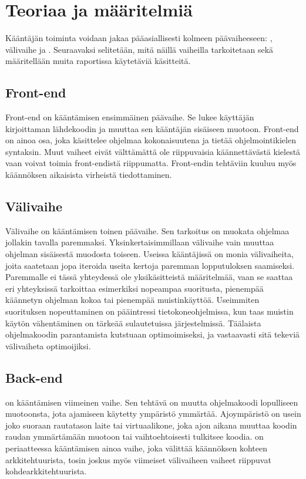 
\section{Teoriaa ja määritelmiä}
Kääntäjän toiminta voidaan jakaa pääasiallisesti kolmeen päävaiheeseen:
, välivaihe ja .
Seuraavaksi selitetään, mitä näillä vaiheilla tarkoitetaan
sekä määritellään muita raportissa käytetäviä käsitteitä.


\subsection{Front-end}
Front-end on kääntämisen ensimmäinen päävaihe.
Se lukee käyttäjän kirjoittaman lähdekoodin
ja muuttaa sen kääntäjän sisäiseen muotoon.
Front-end on ainoa osa, joka käsittelee ohjelmaa kokonaisuutena
ja tietää ohjelmointikielen syntaksin.
Muut vaiheet eivät välttämättä ole riippuvaisia käännettävästä
kielestä vaan voivat toimia front-endistä riippumatta.
Front-endin tehtäviin kuuluu myös käännöksen aikaisista virheistä tiedottaminen.

\subsection{Välivaihe}
Välivaihe on kääntämisen toinen päävaihe.
Sen tarkoitus on muokata ohjelmaa jollakin tavalla paremmaksi.
Yksinkertaisimmillaan välivaihe vain muuttaa ohjelman sisäisestä
muodosta toiseen.
Useissa kääntäjissä on monia välivaiheita, joita saatetaan jopa
iteroida useita kertoja paremman lopputuloksen saamiseksi.
Paremmalle ei tässä yhteydessä ole yksikäsitteistä määritelmää,
vaan se saattaa eri yhteyksissä tarkoittaa esimerkiksi
nopeampaa suoritusta, pienempää käännetyn ohjelman kokoa
tai pienempää muistinkäyttöä. Useimmiten suorituksen nopeuttaminen
on pääintressi tietokoneohjelmissa, kun taas muistin käytön
vähentäminen on tärkeää sulautetuissa järjestelmissä.
Täälaista ohjelmakoodin parantamista kutstuaan optimoimiseksi,
ja vastaavasti sitä tekeviä välivaiheta optimoijiksi.

\subsection{Back-end}
 on kääntämisen viimeinen vaihe.
Sen tehtävä on muutta ohjelmakoodi lopulliseen muotoonsta,
jota ajamiseen käytetty ympäristö ymmärtää.
Ajoympäristö on usein joko suoraan rautatason laite
tai virtuaalikone, joka ajon aikana muuttaa koodin raudan ymmärtämään muotoon
tai vaihtoehtoisesti tulkitsee koodia.
 on periaatteessa kääntämisen ainoa vaihe,
joka välittää käännöksen kohteen arkkitehtuurista,
tosin joskus myös viimeiset välivaiheen vaiheet riippuvat kohdearkkitehtuurista.

